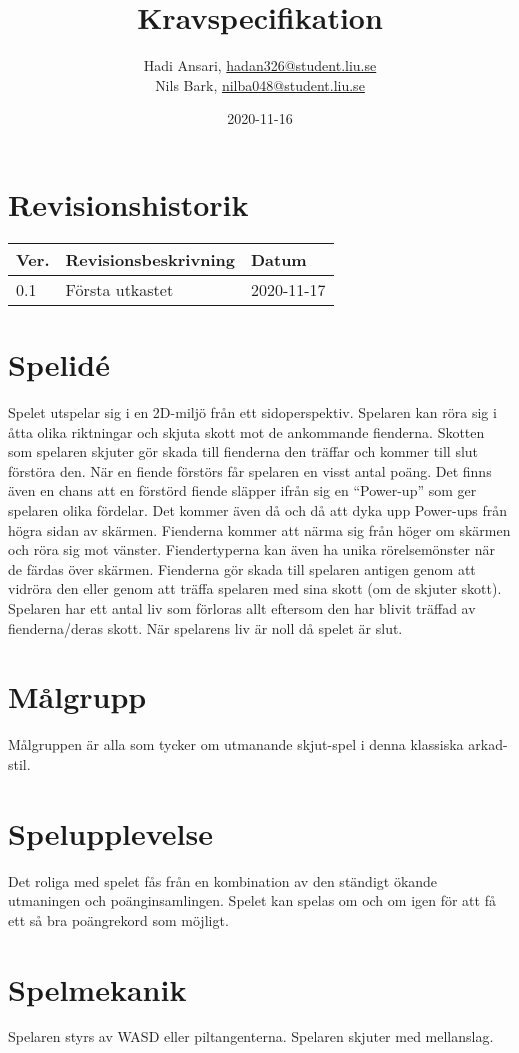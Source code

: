 \documentclass{TDP005mall}
\author{Hadi Ansari, \url{hadan326@student.liu.se}\\
  Nils Bark, \url{nilba048@student.liu.se}}
\title{Kravspecifikation}
\date{2020-11-16}
\begin{document}
\projectpage
\section{Revisionshistorik}
\begin{table}[!h]
\begin{tabularx}{\linewidth}{|l|X|l|}
\hline
Ver. & Revisionsbeskrivning & Datum \\\hline
0.1 & Första utkastet & 2020-11-17 \\\hline

\end{tabularx}
\end{table}


\section{Spelidé}
Spelet utspelar sig i en 2D-miljö från ett sidoperspektiv. Spelaren kan röra sig i åtta olika riktningar och skjuta skott mot de ankommande fienderna. Skotten som spelaren skjuter gör skada till fienderna den träffar och kommer till slut förstöra den. När en fiende förstörs får spelaren en visst antal poäng. Det finns även en chans att en förstörd fiende släpper ifrån sig en ``Power-up'' som ger spelaren olika fördelar. Det kommer även då och då att dyka upp Power-ups från högra sidan av skärmen. Fienderna kommer att närma sig från höger om skärmen och röra sig mot vänster. Fiendertyperna kan även ha unika rörelsemönster när de färdas över skärmen. Fienderna gör skada till spelaren antigen genom att vidröra den eller genom att träffa spelaren med sina skott (om de skjuter skott). Spelaren har ett antal liv som förloras allt eftersom den har blivit träffad av fienderna/deras skott. När spelarens liv är noll då spelet är slut.

\section{Målgrupp}
Målgruppen är alla som tycker om utmanande skjut-spel i denna klassiska arkad-stil.

\section{Spelupplevelse}
Det roliga med spelet fås från en kombination av den ständigt ökande utmaningen och poänginsamlingen. Spelet kan spelas om och om igen för att få ett så bra poängrekord som möjligt.

\section{Spelmekanik}
Spelaren styrs av WASD eller piltangenterna. Spelaren skjuter med mellanslag.
\end{document}

